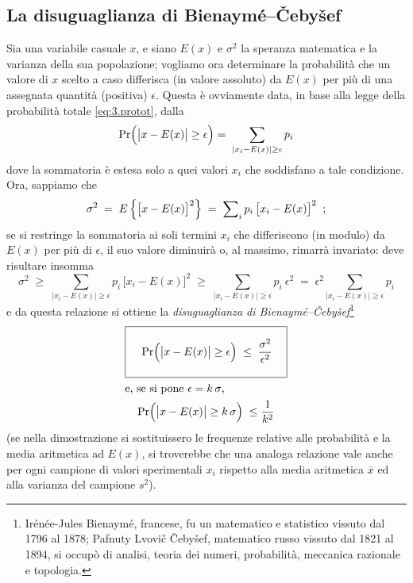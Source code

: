 \subsection{La disuguaglianza di Bienaym\'e--\v Ceby\v
  sef}%
Sia una variabile casuale $x$, e siano $E(x)$ e $\sigma^2$
la speranza matematica e la varianza della sua popolazione;
vogliamo ora determinare la probabilit\`a che un valore di
$x$ scelto a caso differisca (in valore assoluto) da $E(x)$
per pi\`u di una assegnata quantit\`a (positiva) $\epsilon$.
Questa \`e ovviamente data, in base alla legge della
probabilit\`a totale \eqref{eq:3.protot}, dalla
\begin{equation*}
  \Pr \Bigl( \bigl| x - E(x) \bigr| \geq \epsilon \Bigl) \;
    = \; \sum_{|x_i - E(x)| \geq \epsilon} p_i
\end{equation*}
dove la sommatoria \`e estesa solo a quei valori $x_i$ che
soddisfano a tale condizione.  Ora, sappiamo che
\begin{equation*}
  \sigma^2 \; = \;
    E \left\{ \bigl[ x - E(x) \bigr] ^2 \right\}
    \; = \; \sum\nolimits_i p_i \, \bigl[ x_i -
    E(x) \bigr] ^2 \;\; ;
\end{equation*}
se si restringe la sommatoria ai soli termini $x_i$ che
differiscono (in modulo) da $E(x)$ per pi\`u di $\epsilon$,
il suo valore diminuir\`a o, al massimo, rimarr\`a
invariato: deve risultare insomma
\begin{equation*}
  \sigma^2 \; \geq \; \sum_{|x_i - E(x)| \geq
    \epsilon} p_i \, \bigl[ x_i - E(x) \bigr] ^2
    \; \geq \; \sum_{|x_i - E(x)| \geq \epsilon}
    p_i \: \epsilon^2 \; = \; \epsilon^2
    \sum_{|x_i - E(x)| \geq \epsilon} p_i
\end{equation*}
e da questa relazione si ottiene la
\emph{disuguaglianza di Bienaym\'e--\v Ceby\v
sef}\/\thinspace\footnote{Ir\'en\'ee-Jules Bienaym\'e,%
  francese, fu un matematico e statistico vissuto dal
  1796 al 1878; Pafnuty Lvovi\v c \v Ceby\v sef,%
  matematico russo vissuto dal 1821 al 1894, si
  occup\`o di analisi, teoria dei numeri,
  probabilit\`a, meccanica razionale e topologia.}
\begin{gather}
  \boxed{ \rule[-6mm]{0mm}{14mm} \quad \Pr \Bigl(
    \bigl| x - E(x) \bigr| \geq \epsilon \Bigr) \; \leq \;
    \frac{\sigma^2}{\epsilon^2} \quad }
    \label{eq:5.bieceb} \\
  \intertext{e, se si pone $\epsilon = k \, \sigma$,}
  \Pr \Bigl( \bigl| x - E(x) \bigr| \geq k \, \sigma \Bigr)
    \; \leq \frac{1}{k^2} \label{eq:5.bieceb1}
\end{gather}
(se nella dimostrazione si sostituissero le frequenze
relative alle probabilit\`a e la media aritmetica ad $E(x)$,
si troverebbe che una analoga relazione vale anche per ogni
campione di valori sperimentali $x_i$ rispetto alla media
aritmetica $\bar x$ ed alla
varianza del campione $s^2$).%

